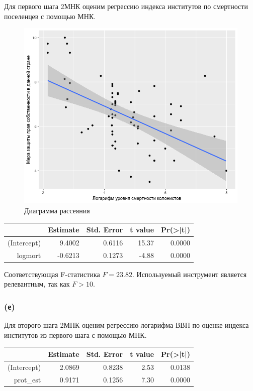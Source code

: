 \documentclass[a4paper,12pt]{article} %
\begin{document}
Для первого шага 2МНК  оценим регрессию индекса институтов по смертности поселенцев  с помощью МНК.


\begin{figure}[h!]
	\centering
	\includegraphics[width=0.7\linewidth]{Rplot3}
	\caption[Диаграмма рассеяния]{Диаграмма рассеяния}
	\label{fig:rplot1}
\end{figure}


\begin{table}[h!]
	\centering
	\begin{tabular}{rrrrr}
		\hline
		& Estimate & Std. Error & t value & Pr(>|t|) \\ 
		\hline
		(Intercept) & 9.4002 & 0.6116 & 15.37 & 0.0000 \\ 
		logmort & -0.6213 & 0.1273 & -4.88 & 0.0000 \\ 
		\hline
	\end{tabular}
\end{table}

Соответствующая F-статистика $ F = 23.82 $. Используемый инструмент является  релевантным, так как $ F > 10 $.


\subsubsection*{(е)}	

Для второго шага 2МНК  оценим регрессию 
логарифма ВВП по оценке  индекса институтов из первого шага с помощью МНК.

\begin{table}[h!]
	\centering
	\begin{tabular}{rrrrr}
		\hline
		& Estimate & Std. Error & t value & Pr(>|t|) \\ 
		\hline
		(Intercept) & 2.0869 & 0.8238 & 2.53 & 0.0138 \\ 
		prot\_est & 0.9171 & 0.1256 & 7.30 & 0.0000 \\ 
		\hline
	\end{tabular}
\end{table}
\end{document}
